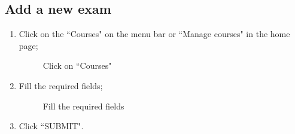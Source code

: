 \documentclass[ManualeUtente]{subfiles}
\begin{document}
\subsection{Add a new exam}
\begin{enumerate}
	\item Click on the \textquotedblleft Courses" on the menu bar or \textquotedblleft Manage courses" in the home page;
	\begin{figure}[H]
		\centering
		\caption{Click on ``Courses"}
		\label{fig:Click on "Courses"}
	\end{figure}
	\item Fill the required fields;
	\begin{figure}[H]
		\centering
		\caption{Fill the required fields}
		\label{fig:Fill the required fields}
	\end{figure}
	\item Click \textquotedblleft SUBMIT".

\end{enumerate}
\end{document}
